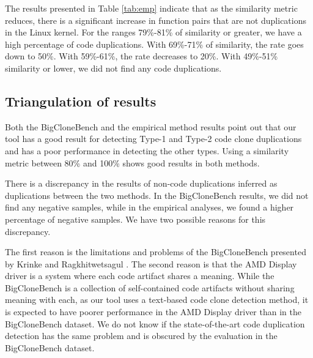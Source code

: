 

The results presented in Table \ref{tab:emp} indicate that as the similarity metric reduces, 
there is a significant increase in function pairs that are not duplications in the Linux kernel. 
For the ranges 79\%-81\% of similarity or greater, we have a high percentage of code duplications. 
With 69\%-71\% of similarity, the rate goes down to 50\%. With 59\%-61\%, the rate decreases to 20\%.
With 49\%-51\% similarity or lower, we did not find any code duplications.

\subsection{Triangulation of results}

Both the BigCloneBench and the empirical method results point out that our tool has a good 
result for detecting Type-1 and Type-2 code clone duplications and has a poor performance 
in detecting the other types. Using a similarity metric between 80\% and 100\% shows good 
results in both methods.

There is a discrepancy in the results of non-code duplications inferred as duplications 
between the two methods. In the BigCloneBench results, we did not find any negative samples,
while in the empirical analyses, we found a higher percentage of negative samples. We have 
two possible reasons for this discrepancy.

The first reason is the limitations and problems of the BigCloneBench presented by Krinke 
and Ragkhitwetsagul \citep{bigfail}. The second reason is that the AMD Display driver 
is a system where each code artifact shares a meaning. While the BigCloneBench is a 
collection of self-contained code artifacts without sharing meaning with each, as our 
tool uses a text-based code clone detection method, it is expected to have poorer 
performance in the AMD Display driver than in the BigCloneBench dataset. We do not know 
if the state-of-the-art code duplication detection has the same problem and is obscured 
by the evaluation in the BigCloneBench dataset.
